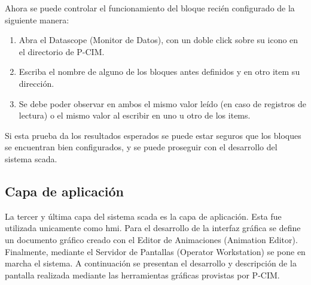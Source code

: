 Ahora se puede controlar el funcionamiento del bloque recién configurado de la 
siguiente manera:
\begin{enumerate}
  \item Abra el Datascope (Monitor de Datos), con un doble click sobre su icono 
  en el directorio de P-CIM.
  \item Escriba el nombre de alguno de los bloques antes definidos  y en otro 
  item su dirección.
  \item Se debe poder observar en ambos el mismo valor leído (en caso de
  registros de lectura) o el mismo valor al escribir en uno u otro de los items.
\end{enumerate}
Si esta prueba da los resultados esperados se puede estar seguros que
los bloques se encuentran bien configurados, y se puede proseguir con el
desarrollo del sistema \gls{scada}.

\subsection{Capa de aplicación}
\label{subsec:CapaAplicacion}

La tercer y última capa del sistema \gls{scada} es la capa de aplicación. Esta
fue utilizada unicamente como \gls{hmi}. Para el
desarrollo de la interfaz gráfica se define un documento gráfico creado con el
Editor de Animaciones (Animation Editor). Finalmente, mediante el Servidor de 
Pantallas (Operator Workstation) se pone en marcha el sistema. A continuación se 
presentan el desarrollo y descripción de la pantalla realizada mediante las 
herramientas gráficas provistas por P-CIM.



